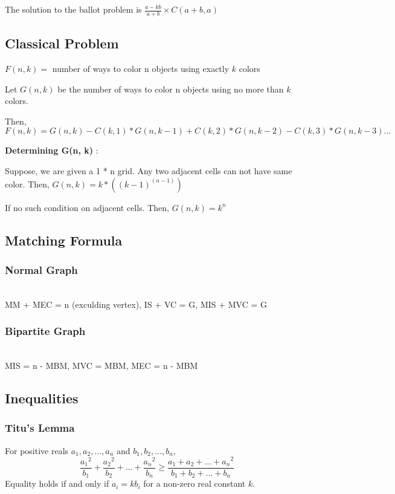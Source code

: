 The solution to the ballot problem is $\frac{a - kb}{a+b} \times C(a + b, a)$

\subsection{Classical Problem}
$ F(n, k) = $ number of ways to color n objects using exactly $ k $ colors

Let $ G(n, k) $ be the number of ways to color n objects using no more than $ k $ colors.

Then, $ F(n, k) = G(n, k) - C(k, 1) * G(n, k-1) + C(k, 2) * G(n, k-2) - C(k, 3) * G(n, k-3) ... $

\textbf{Determining G(n, k)} :

Suppose, we are given a 1 * n grid. Any two adjacent cells can not have same color.
Then, $G(n, k) = k * ((k-1)^(n-1))$

If no such condition on adjacent cells.
Then, $G(n, k) = k ^ n$

\subsection{Matching Formula}

\subsubsection{Normal Graph} \\
MM + MEC = n (exculding vertex), IS + VC = G, MIS + MVC = G \\

\subsubsection{Bipartite Graph} \\
MIS = n - MBM, MVC = MBM, MEC = n - MBM \\

\subsection{Inequalities}
\subsubsection{Titu's Lemma}
For positive reals $a_1, a_2, \ldots, a_n$ and $b_1, b_2, \ldots, b_n$,
$$\frac{{a_1}^2}{b_1} + \frac{{a_2}^2}{b_2} + \ldots + \frac{{a_n}^2}{b_n} \geq \frac{{a_1 + a_2 + \ldots + a_n}^2}{b_1 + b_2 + \ldots + b_n}$$
Equality holds if and only if $ a_i = kb_i$ for a non-zero real constant $k$.
